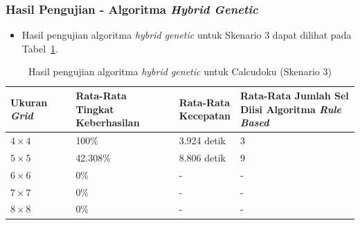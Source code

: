 \documentclass{beamer}
\begin{document}
\begin{frame}
\frametitle{Hasil Pengujian - Algoritma \textit{Hybrid Genetic}}
\begin{itemize}
\item Hasil pengujian algoritma \textit{hybrid genetic} untuk Skenario 3 dapat dilihat pada Tabel~\ref{tab:pengujianhg3}.
\end{itemize}
\begin{table}
\tiny
\centering
\captionsetup{justification=centering}
\caption[Hasil pengujian algoritma \textit{hybrid genetic} untuk Calcudoku (Skenario 3)]{Hasil pengujian algoritma \textit{hybrid genetic} untuk Calcudoku (Skenario 3)}
\begin{tabular}{| l | l | l | l |}
\hline
Ukuran \textit{Grid} & \makecell[c]{Rata-Rata \\ Tingkat Keberhasilan} & \makecell[c]{Rata-Rata \\ Kecepatan} & \makecell[c]{Rata-Rata Jumlah Sel \\ Diisi Algoritma \textit{Rule Based}} \\
\hline \hline
\begin{math}4 \times 4\end{math} & 100\% & 3.924 detik & 3 \\
\hline
\begin{math}5 \times 5\end{math} & 42.308\% & 8.806 detik & 9 \\
\hline
\begin{math}6 \times 6\end{math} & 0\% & - & - \\
\hline
\begin{math}7 \times 7\end{math} & 0\% & - & - \\
\hline
\begin{math}8 \times 8\end{math} & 0\% & - & - \\
\hline
\end{tabular}
\label{tab:pengujianhg3}
\end{table}
\end{frame}

\end{document}
